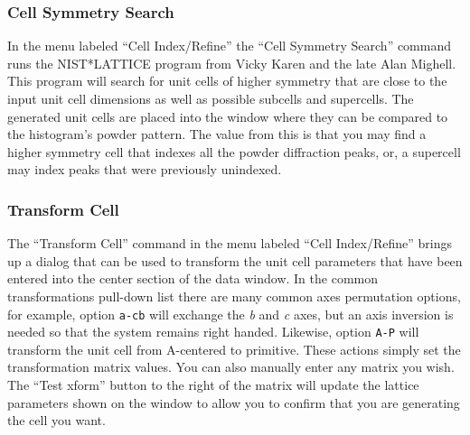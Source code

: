 \subsubsection{Cell Symmetry Search}
In the menu labeled ``Cell Index/Refine'' the ``Cell Symmetry Search'' command runs the NIST*LATTICE program from Vicky Karen and the late Alan Mighell.
This program will search for unit cells of higher symmetry that are close to the input unit cell dimensions as well as possible subcells and supercells.
The generated unit cells are placed into the window where they can be compared to the histogram's powder pattern. 
The value from this is that you may find a higher symmetry cell that indexes all the powder diffraction peaks, or, a supercell may index peaks that were previously unindexed.

\subsubsection{Transform Cell}
The ``Transform Cell'' command in the menu labeled ``Cell Index/Refine'' brings up a dialog that can be used to transform the unit cell parameters that have been entered into the center section of the data window. In the common transformations pull-down list there are many common axes permutation options, for example, option \texttt{a-cb} will exchange the \textit{b} and \textit{c} axes, but an axis inversion is needed so that the system remains right handed. Likewise, option \texttt{A-P} will transform the unit cell from A-centered to primitive. These actions simply set the transformation matrix values. You can also manually enter any matrix you wish. The ``Test xform'' button  to the right of the matrix will update the lattice parameters shown on the window to allow you to confirm that you are generating the cell you want. 

